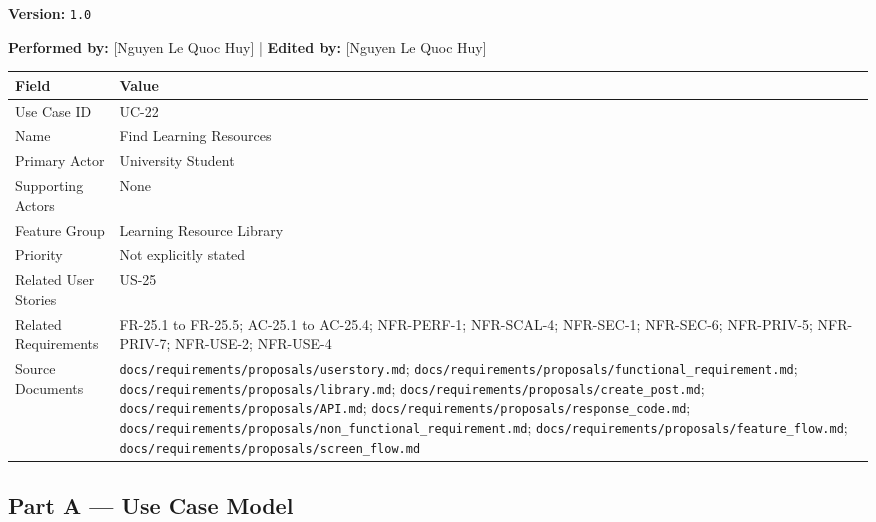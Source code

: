 \documentclass[12pt]{article}
\renewcommand{\baselinestretch}{1.5}
\begin{document}
\textbf{Version:} \texttt{1.0}
\par\medskip

\textbf{Performed by:} [Nguyen Le Quoc Huy] | \textbf{Edited by:} [Nguyen Le Quoc Huy]
\par\medskip

\begingroup
\small
\renewcommand{\baselinestretch}{1.0}\selectfont
\renewcommand{\arraystretch}{1.15}
\setlength{\tabcolsep}{6pt}
\begin{longtable}{|>{\raggedright\arraybackslash}p{}|>{\raggedright\arraybackslash}p{}|}
\hline
\textbf{Field} & \textbf{Value} \\ \hline
\endhead
Use Case ID & UC-22 \\ \hline
Name & Find Learning Resources \\ \hline
Primary Actor & University Student \\ \hline
Supporting Actors & None \\ \hline
Feature Group & Learning Resource Library \\ \hline
Priority & Not explicitly stated \\ \hline
Related User Stories & US-25 \\ \hline
Related Requirements & FR-25.1 to FR-25.5; AC-25.1 to AC-25.4; NFR-PERF-1; NFR-SCAL-4; NFR-SEC-1; NFR-SEC-6; NFR-PRIV-5; NFR-PRIV-7; NFR-USE-2; NFR-USE-4 \\ \hline
Source Documents & \texttt{docs/requirements/proposals/userstory.md}; \texttt{docs/requirements/proposals/functional\_requirement.md}; \texttt{docs/requirements/proposals/library.md}; \texttt{docs/requirements/proposals/create\_post.md}; \texttt{docs/requirements/proposals/API.md}; \texttt{docs/requirements/proposals/response\_code.md}; \texttt{docs/requirements/proposals/non\_functional\_requirement.md}; \texttt{docs/requirements/proposals/feature\_flow.md}; \texttt{docs/requirements/proposals/screen\_flow.md} \\ \hline
\end{longtable}
\endgroup
\par\medskip

\hypertarget{sec:part-a-use-case-model}{}
\subsection*{Part A --- Use Case Model}
\par\medskip

\hypertarget{sec:a1-focused-use-case-diagram}{}
\end{document}
